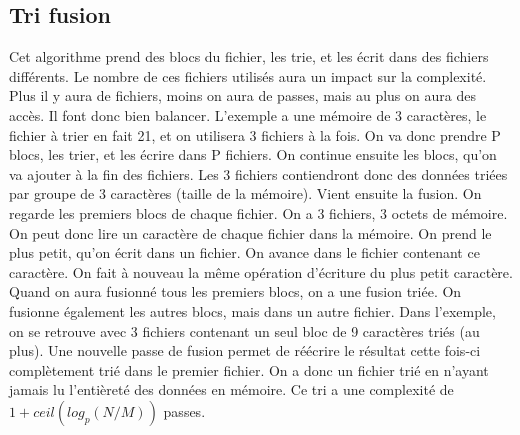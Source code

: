 \documentclass[10pt]{article}
\begin{document}
\subsection{Tri fusion}
Cet algorithme prend des blocs du fichier, les trie, et les écrit dans des fichiers différents. Le nombre de ces fichiers utilisés aura un impact sur la complexité. Plus il y aura de fichiers, moins on aura de passes, mais au plus on aura des accès. Il font donc bien balancer. L'exemple a une mémoire de 3 caractères, le fichier à trier en fait 21, et on utilisera 3 fichiers à la fois.  
\newline \newline 
On va donc prendre P blocs, les trier, et les écrire dans P fichiers. On continue ensuite les blocs, qu'on va ajouter à la fin des fichiers. Les 3 fichiers contiendront donc des données triées par groupe de 3 caractères (taille de la mémoire). Vient ensuite la fusion. On regarde les premiers blocs de chaque fichier. On a 3 fichiers, 3 octets de mémoire. On peut donc lire un caractère de chaque fichier dans la mémoire. On prend le plus petit, qu'on écrit dans un fichier. On avance dans le fichier contenant ce caractère. On fait à nouveau la même opération d'écriture du plus petit caractère. Quand on aura fusionné tous les premiers blocs, on a une fusion triée. 
\newline \newline 
On fusionne également les autres blocs, mais dans un autre fichier. Dans l'exemple, on se retrouve avec 3 fichiers contenant un seul bloc de 9 caractères triés (au plus). Une nouvelle passe de fusion permet de réécrire le résultat cette fois-ci complètement trié dans le premier fichier. 
\newline \newline 
On a donc un fichier trié en n'ayant jamais lu l'entièreté des données en mémoire. Ce tri a une complexité de $1+ceil(log_p(N/M))$ passes. 
\end{document}
